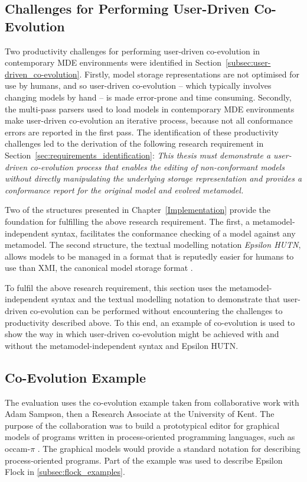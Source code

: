 \subsection{Challenges for Performing User-Driven Co-Evolution}
\label{subsec:challenges_for_performing_user-driven_co-evo}
Two productivity challenges for performing user-driven co-evolution in contemporary MDE environments were identified in Section~\ref{subsec:user-driven_co-evolution}. Firstly, model storage representations are not optimised for use by humans, and so user-driven co-evolution -- which typically involves changing models by hand -- is made error-prone and time consuming. Secondly, the multi-pass parsers used to load models in contemporary MDE environments make user-driven co-evolution an iterative process, because not all conformance errors are reported in the first pass. The identification of these productivity challenges led to the derivation of the following research requirement in Section~\ref{sec:requirements_identification}: \emph{This thesis must demonstrate a user-driven co-evolution process that enables the editing of non-conformant models without directly manipulating the underlying storage representation and provides a conformance report for the original model and evolved metamodel.}

Two of the structures presented in Chapter~\ref{Implementation} provide the foundation for fulfilling the above research requirement. The first, a metamodel-independent syntax, facilitates the conformance checking of a model against any metamodel. The second structure, the textual modelling notation \emph{Epsilon HUTN}, allows models to be managed in a format that is reputedly easier for humans to use than XMI, the canonical model storage format \cite{hutn}.

To fulfil the above research requirement, this section uses the metamodel-independent syntax and the textual modelling notation to demonstrate that user-driven co-evolution can be performed without encountering the challenges to productivity described above. To this end, an example of co-evolution is used to show the way in which user-driven co-evolution might be achieved with and without the metamodel-independent syntax and Epsilon HUTN.

\subsection{Co-Evolution Example}
\label{subsec:user-driven_co-evolution_example}
The evaluation uses the co-evolution example taken from collaborative work with Adam Sampson, then a Research Associate at the University of Kent. The purpose of the collaboration was to build a prototypical editor for graphical models of programs written in process-oriented programming languages, such as occam-$\pi$ \cite{occam_pi}. The graphical models would provide a standard notation for describing process-oriented programs. Part of the example was used to describe Epsilon Flock in \ref{subsec:flock_examples}.

